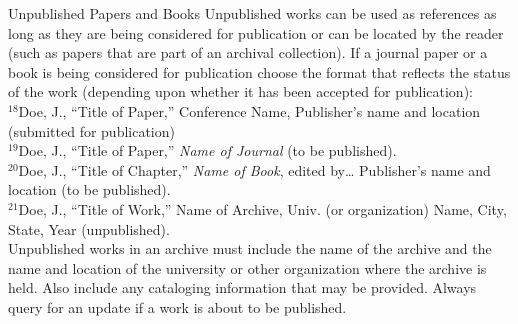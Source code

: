 Unpublished Papers and Books Unpublished works can be used as references as long as they are being considered for publication or can be located by the reader (such as papers that are part of an archival collection). If a journal paper or a book is being considered for publication choose the format that reflects the status of the work (depending upon whether it has been accepted for publication): \\

$^{18}$Doe, J., “Title of Paper,” Conference Name, Publisher’s name and location (submitted for publication) \\ $^{19}$Doe, J., “Title of Paper,” \textit{Name of Journal} (to be published). \\ $^{20}$Doe, J., “Title of Chapter,” \textit{Name of Book}, edited by… Publisher’s name and location (to be published). \\ $^{21}$Doe, J., “Title of Work,” Name of Archive, Univ. (or organization) Name, City, State, Year (unpublished). \\

Unpublished works in an archive must include the name of the archive and the name and location of the university or other organization where the archive is held. Also include any cataloging information that may be provided. Always query for an update if a work is about to be published.

\pagebreak
